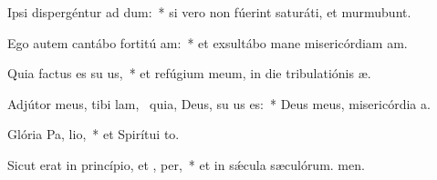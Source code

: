 \item Ipsi dispergéntur ad dum:~* si vero non fúerint saturáti, et murmubunt.
\item Ego autem cantábo fortitú am:~* et exsultábo mane misericórdiam am.
\item Quia factus es su us,~* et refúgium meum, in die tribulatiónis æ.
\item Adjútor meus, tibi lam,~\pscross{} quia, Deus, su us es:~* Deus meus, misericórdia a.
\item Glória Pa,  lio,~* et Spirítui to.
\item Sicut erat in princípio, et ,  per,~* et in sǽcula sæculórum. men.
